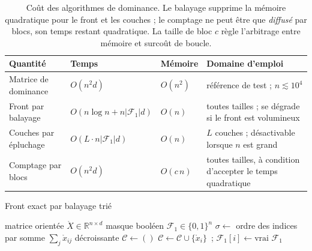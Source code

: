 \documentclass[11pt,a4paper]{article}
\theoremstyle{definition}
\theoremstyle{remark}
\newcommand{\R}{\mathbb{R}}
\newcommand{\abs}[1]{\left\lvert #1 \right\rvert}
\newcommand{\Xor}{\mathring{X}}
\begin{document}
\medskip

\begin{table}[htbp]
  \centering
  \small
  \renewcommand{\arraystretch}{1.25}
  \begin{tabularx}{\textwidth}{@{}l l l Y@{}}
    \toprule
    \textbf{Quantité} & \textbf{Temps} & \textbf{Mémoire} & \textbf{Domaine d'emploi} \\
    \midrule
    Matrice de dominance & $O(n^2 d)$ & $O(n^2)$ &
      référence de test ; $n \lesssim 10^4$ \\
    Front par balayage & $O(n \log n + n \abs{\mathcal{F}_1} d)$ & $O(n)$ &
      toutes tailles ; se dégrade si le front est volumineux \\
    Couches par épluchage & $O(L \cdot n \abs{\mathcal{F}_1} d)$ & $O(n)$ &
      $L$ couches ; désactivable lorsque $n$ est grand \\
    Comptage par blocs & $O(n^2 d)$ & $O(c\,n)$ &
      toutes tailles, à condition d'accepter le temps quadratique \\
    \bottomrule
  \end{tabularx}
  \caption{Coût des algorithmes de dominance. Le balayage supprime la mémoire quadratique
  pour le front et les couches ; le comptage ne peut être que \emph{diffusé} par blocs,
  son temps restant quadratique. La taille de bloc $c$ règle l'arbitrage entre mémoire et
  surcoût de boucle.}
  \label{tab:cout-pareto}
\end{table}

\bigskip

\begin{algorithm}[htbp]
  \caption{Front exact par balayage trié}
  \label{algo:front-balayage}
  \begin{algorithmic}[1]
    \Require matrice orientée $\Xor \in \R^{n \times d}$
    \Ensure masque booléen $\mathcal{F}_1 \in \{0,1\}^n$
    \State $\sigma \gets$ ordre des indices par somme $\sum_j \mathring{x}_{ij}$
      décroissante 
    \State $\mathcal{C} \gets ()$ 
        \State $\mathcal{C} \gets \mathcal{C} \cup \{\mathring{x}_i\}$~;\quad
          $\mathcal{F}_1[i] \gets \text{vrai}$
      \EndIf
    \EndFor
    \State \Return $\mathcal{F}_1$
  \end{algorithmic}
\end{algorithm}
\end{document}

